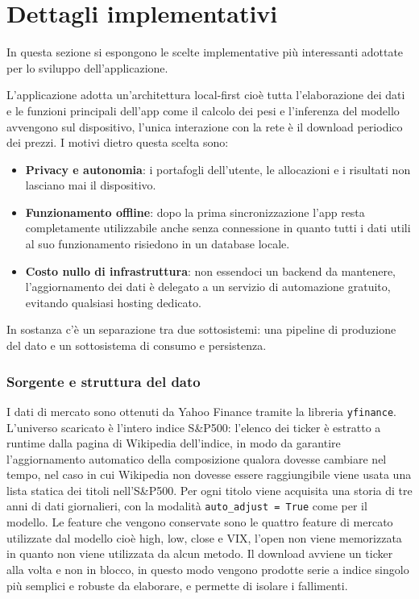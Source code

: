 \section{Dettagli implementativi}
In questa sezione si espongono le scelte implementative più interessanti adottate per lo sviluppo dell'applicazione.

L'applicazione adotta un'architettura local-first cioè tutta l'elaborazione dei dati e le funzioni principali dell'app come il calcolo dei pesi e l'inferenza del modello avvengono sul dispositivo, l'unica interazione con la rete è il download periodico dei prezzi. I motivi dietro questa scelta sono:
\begin{itemize}
    \item \textbf{Privacy e autonomia}: i portafogli dell'utente, le allocazioni e i risultati non lasciano mai il dispositivo.
    \item \textbf{Funzionamento offline}: dopo la prima sincronizzazione l'app resta completamente utilizzabile anche senza connessione in quanto tutti i dati utili al suo funzionamento risiedono in un database locale.
    \item \textbf{Costo nullo di infrastruttura}: non essendoci un backend da mantenere, l'aggiornamento dei dati è delegato a un servizio di automazione gratuito, evitando qualsiasi hosting dedicato.

\end{itemize}
In sostanza c'è un separazione tra due sottosistemi: una pipeline di produzione del dato e un sottosistema di consumo e persistenza.
\subsubsection{Sorgente e struttura del dato}
\label{sec:sorgente e struttura del dato}
I dati di mercato sono ottenuti da Yahoo Finance tramite la libreria \lstinline{yfinance}. 
L'universo scaricato è l'intero indice S\&P500: l'elenco dei ticker è estratto a runtime dalla pagina di Wikipedia dell'indice, in modo da garantire l'aggiornamento automatico della composizione qualora dovesse cambiare nel tempo, nel caso in cui Wikipedia non dovesse essere raggiungibile viene usata una lista statica dei titoli nell'S\&P500.
Per ogni titolo viene acquisita una storia di tre anni di dati giornalieri, con la modalità \lstinline{auto_adjust = True} come per il modello. Le feature che vengono conservate sono le quattro feature di mercato utilizzate dal modello cioè high, low, close e VIX, l'open non viene memorizzata in quanto non viene utilizzata da alcun metodo. 
Il download avviene un ticker alla volta e non in blocco, in questo modo vengono prodotte serie a indice singolo più semplici e robuste da elaborare, e permette di isolare i fallimenti.
